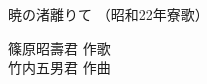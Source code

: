\documentclass[10pt,b5j]{tarticle} %
\begin{document}
\begin{minipage}[c]{0.7\hsize} %
    \begin{center}
        {\LARGE
            暁の渚離りて %
        }
        {\small 
            （昭和22年寮歌） %
        }
    \end{center}
\end{minipage}
\begin{minipage}[c]{0.3\hsize} %
    \begin{flushright} %
        篠原昭壽君 作歌\\竹内五男君 作曲 %
    \end{flushright}
\end{minipage}
\end{document}
